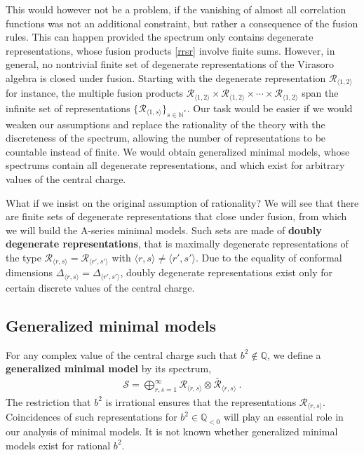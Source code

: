 \documentclass[12pt, a4paper, notitlepage, twoside]{report}
\numberwithin{equation}{section}
\theoremstyle{break}
\begin{document}
This would however not be a problem, if the vanishing of almost all correlation functions was not an additional constraint, but rather a consequence of the fusion rules.
This can happen provided the spectrum only contains degenerate representations, whose fusion products \eqref{rrsr} involve finite sums. 
However, in general, no nontrivial finite set of degenerate representations of the Virasoro algebra is closed under fusion.
Starting with the degenerate representation $\mathcal{R}_{\langle 1,2 \rangle}$ for instance, the multiple fusion products $\mathcal{R}_{\langle 1,2 \rangle}\times \mathcal{R}_{\langle 1,2 \rangle}\times \cdots \times \mathcal{R}_{\langle 1,2 \rangle}$ span the infinite set of representations $\{\mathcal{R}_{\langle 1,s \rangle}\}_{s\in{\mathbb{N}}^*}$.
Our task would be easier if we would weaken our assumptions and replace the rationality of the theory with the discreteness of the spectrum, allowing the number of representations to be countable instead of finite.
We would obtain generalized minimal models, whose spectrums contain all degenerate representations, and which exist for arbitrary values of the central charge. 

What if we insist on the original assumption of rationality? We will see that there are finite sets 
of degenerate representations that close under fusion, from which we will build the A-series minimal models.
Such sets are made of
\textbf{\boldmath doubly degenerate representations}, that is maximally degenerate representations of the type $\mathcal{R}_{\langle r,s \rangle}=\mathcal{R}_{\langle r',s' \rangle}$ with $\langle r,s \rangle\neq \langle r',s' \rangle$. Due to the 
equality of conformal dimensions $\Delta_{\langle r,s \rangle}=\Delta_{\langle r',s' \rangle}$, doubly degenerate representations exist only for certain discrete values of the central charge. 

\subsection{Generalized minimal models}

For any complex value of the central charge such that $b^2\notin \mathbb{Q}$, we define a \textbf{\boldmath generalized minimal model} by its spectrum,
\begin{align}
 \boxed{\mathcal{S} = \bigoplus_{r,s=1}^\infty \mathcal{R}_{\langle r,s \rangle}\otimes \bar{\mathcal{R}}_{\langle r,s \rangle}}\ .
\end{align}
The restriction that $b^2$ is irrational ensures that the representations $\mathcal{R}_{\langle r,s \rangle}$. Coincidences of such representations for $b^2\in\mathbb{Q}_{<0}$ will play an essential role in our analysis of minimal models. It is not known whether  generalized minimal models exist for rational $b^2$. 
\end{document}
